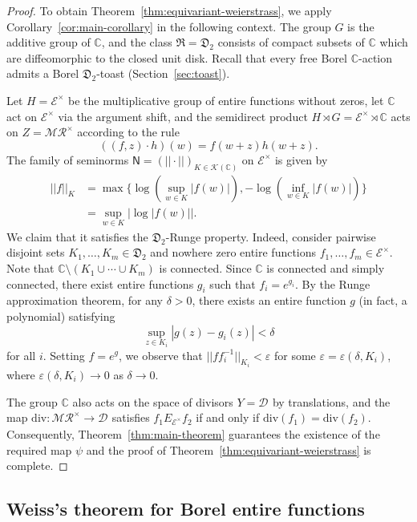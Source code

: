 \documentclass[12pt]{paper}
\numberwithin{equation}{section}
\theoremstyle{plain}
\theoremstyle{definition}
\newcommand{\C}{\mathbb{C}}
\newcommand{\mfD}{\mathfrak{D}}
\newcommand{\mfR}{\mathfrak{R}}
\newcommand{\vietoris}[2][]{\mathcal{K}_{#1}(#2)}
\newcommand{\merom}[1][]{\mathcal{MR}_{#1}}
\newcommand{\meromnz}{\merom^{\times}}
\newcommand{\holomnz}[1][]{\mathcal{E}^{\times}_{#1}}
\newcommand{\divis}[1][]{\mathcal{D}_{#1}}
\newcommand{\dm}{\mathrm{div}}      %
\newcommand{\unifn}{\mathsf{N}}
\newcommand{\norm}[1]{||#1||}
\renewcommand{\epsilon}{\varepsilon}
\begin{document}
\begin{proof}
  To obtain Theorem~\ref{thm:equivariant-weierstrass}, we apply Corollary~\ref{cor:main-corollary}
  in the following context.  The group \(G\) is the additive group of \(\C\), and the class
  \(\mfR = \mfD_{2}\) consists of compact subsets of \(\C\) which are diffeomorphic to the closed
  unit disk.  Recall that every free Borel \(\C\)-action admits a Borel \(\mfD_{2}\)-toast
  (Section~\ref{sec:toast}).

  Let \(H = \holomnz\) be the multiplicative group of entire functions without zeros, let \(\C \)
  act on \(\holomnz\) via the argument shift, and the semidirect product
  \( H \rtimes G = \holomnz \rtimes \C\) acts on \(Z = \meromnz\) according to the rule
  \[((f, z) \cdot h)(w) = f(w+z)h(w+z).\]
  The family of seminorms \(\unifn = (\norm{\cdot})_{K \in \vietoris{\C}} \) on \(\holomnz\) is
  given by
  \[\begin{aligned}\norm{f}_{K} &= \max\{\log (\sup_{w \in K}|f(w)|) , -\log(\inf_{w \in K}|f(w)|)\}
    \\& = \sup_{w \in K}\big|\log|f(w)|\big|.\end{aligned}\]
We claim that it satisfies the \(\mfD_{2}\)-Runge property.  Indeed, consider pairwise disjoint sets
\(K_{1}, \ldots, K_{m} \in \mfD_{2}\) and nowhere zero entire functions
\(f_{1}, \ldots, f_{m} \in \holomnz\).  Note that \(\C \setminus (K_{1} \cup \cdots \cup K_{m}) \)
is connected.
Since \(\C\) is connected and simply connected, there exist entire functions
\(g_{i}\) such that \(f_{i} = e^{g_{i}}\).  By the Runge approximation theorem, for any
\(\delta > 0\), there exists an entire function \(g\) (in fact, a polynomial) satisfying
\[
\sup_{z \in K_{i}}|g(z) - g_{i}(z)| < \delta
\]
for all \(i\).  Setting \(f = e^{g}\), we observe
that \(\norm{ff^{-1}_{i}}_{K_{i}} < \epsilon\) for some \(\epsilon = \epsilon(\delta, K_{i})\),
where \(\epsilon(\delta, K_{i}) \to 0\) as \(\delta \to 0\).

The group \(\C\) also acts on the space of divisors \(Y = \divis\) by translations, and the map
\(\dm : \meromnz \to \divis\) satisfies \( f_{1} E_{\holomnz} f_{2} \) if and only if
\(\dm(f_{1}) = \dm(f_{2})\). Consequently, Theorem~\ref{thm:main-theorem} guarantees the existence
of the required map \(\psi\) and the proof of Theorem~\ref{thm:equivariant-weierstrass} is complete.
\end{proof}





\subsection{Weiss's theorem for Borel entire functions}
\label{s:weierstrass-liftings}
\end{document}

